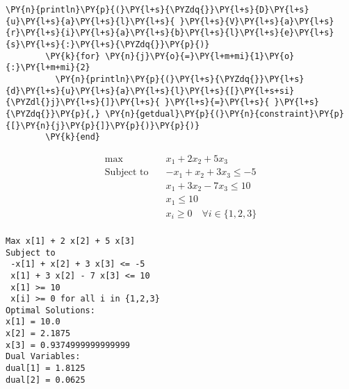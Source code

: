 \begin{Verbatim}[commandchars=\\\{\}]
        \PY{n}{println}\PY{p}{(}\PY{l+s}{\PYZdq{}}\PY{l+s}{D}\PY{l+s}{u}\PY{l+s}{a}\PY{l+s}{l}\PY{l+s}{ }\PY{l+s}{V}\PY{l+s}{a}\PY{l+s}{r}\PY{l+s}{i}\PY{l+s}{a}\PY{l+s}{b}\PY{l+s}{l}\PY{l+s}{e}\PY{l+s}{s}\PY{l+s}{:}\PY{l+s}{\PYZdq{}}\PY{p}{)}
        \PY{k}{for} \PY{n}{j}\PY{o}{=}\PY{l+m+mi}{1}\PY{o}{:}\PY{l+m+mi}{2}
          \PY{n}{println}\PY{p}{(}\PY{l+s}{\PYZdq{}}\PY{l+s}{d}\PY{l+s}{u}\PY{l+s}{a}\PY{l+s}{l}\PY{l+s}{[}\PY{l+s+si}{\PYZdl{}j}\PY{l+s}{]}\PY{l+s}{ }\PY{l+s}{=}\PY{l+s}{ }\PY{l+s}{\PYZdq{}}\PY{p}{,} \PY{n}{getdual}\PY{p}{(}\PY{n}{constraint}\PY{p}{[}\PY{n}{j}\PY{p}{]}\PY{p}{)}\PY{p}{)}
        \PY{k}{end}
\end{Verbatim}


\begin{align*}\max\quad & x_{1} + 2 x_{2} + 5 x_{3}\\
\text{Subject to} \quad & -x_{1} + x_{2} + 3 x_{3} \leq -5\\
 & x_{1} + 3 x_{2} - 7 x_{3} \leq 10\\
 & x_{1} \leq 10\\
 & x_{i} \geq 0 \quad\forall i \in \{1,2,3\}\\
\end{align*}


    
    \begin{Verbatim}[commandchars=\\\{\}]
Max x[1] + 2 x[2] + 5 x[3]
Subject to
 -x[1] + x[2] + 3 x[3] <= -5
 x[1] + 3 x[2] - 7 x[3] <= 10
 x[1] >= 10
 x[i] >= 0 for all i in {1,2,3}
Optimal Solutions:
x[1] = 10.0
x[2] = 2.1875
x[3] = 0.9374999999999999
Dual Variables:
dual[1] = 1.8125
dual[2] = 0.0625

    \end{Verbatim}

